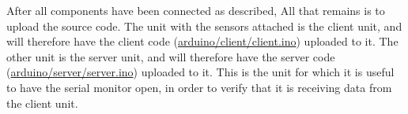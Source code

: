 After all components have been connected as described, All that remains is to upload the source code.
The unit with the sensors attached is the client unit, and will therefore have the client code (\url{arduino/client/client.ino}) uploaded to it.
The other unit is the server unit, and will therefore have the server code (\url{arduino/server/server.ino}) uploaded to it.
This is the unit for which it is useful to have the serial monitor open, in order to verify that it is receiving data from the client unit.

